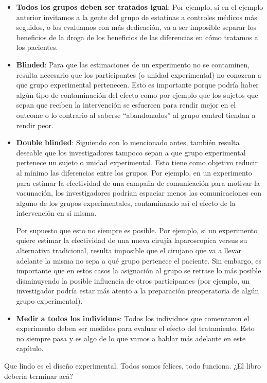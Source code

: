 \documentclass[
  letterpaper,
  DIV=11,
  numbers=noendperiod,
  oneside]{scrreprt}
\begin{document}
\begin{itemize}
\item
  \textbf{Todos los grupos deben ser tratados igual}: Por ejemplo, si en
  el ejemplo anterior invitamos a la gente del grupo de estatinas a
  controles médicos más seguidos, o los evaluamos con más dedicación, va
  a ser imposible separar los beneficios de la droga de los beneficios
  de las diferencias en cómo tratamos a los pacientes.
\item
  \textbf{Blinded}: Para que las estimaciones de un experimento no se
  contaminen, resulta necesario que los participantes (o unidad
  experimental) no conozcan a que grupo experimental pertenecen. Esto es
  importante porque podría haber algún tipo de contaminación del efecto
  como por ejemplo que los sujetos que sepan que reciben la intervención
  se esfuercen para rendir mejor en el outcome o lo contrario al saberse
  ``abandonados'' al grupo control tiendan a rendir peor.
\item
  \textbf{Double blinded}: Siguiendo con lo mencionado antes, también
  resulta deseable que los investigadores tampoco sepan a que grupo
  experimental pertenece un sujeto o unidad experimental. Esto tiene
  como objetivo reducir al mínimo las diferencias entre los grupos. Por
  ejemplo, en un experimento para estimar la efectividad de una campaña
  de comunicación para motivar la vacunación, los investigadores podrían
  espaciar menos las comunicaciones con alguno de los grupos
  experimentales, contaminando así el efecto de la intervención en sí
  misma.

  Por supuesto que esto no siempre es posible. Por ejemplo, si un
  experimento quiere estimar la efectividad de una nueva cirujía
  laparoscopica versus su alternativa tradicional, resulta imposible que
  el cirujano que va a llevar adelante la misma no sepa a qué grupo
  pertenece el paciente. Sin embargo, es importante que en estos casos
  la asignación al grupo se retrase lo más posible disminuyendo la
  posible influencia de otros participantes (por ejemplo, un
  investigador podría estar más atento a la preparación preoperatoria de
  algún grupo experimental).
\item
  \textbf{Medir a todos los individuos}: Todos los individuos que
  comenzaron el experimento deben ser medidos para evaluar el efecto del
  tratamiento. Esto no siempre pasa y es algo de lo que vamos a hablar
  más adelante en este capítulo.
\end{itemize}

Que lindo es el diseño experimental. Todos somos felices, todo funciona.
¿El libro debería terminar acá?
\end{document}
